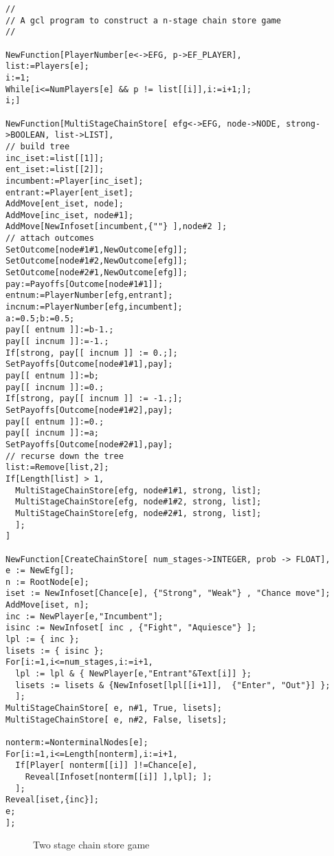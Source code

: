 \begin{verbatim}
//
// A gcl program to construct a n-stage chain store game
//

NewFunction[PlayerNumber[e<->EFG, p->EF_PLAYER],
list:=Players[e];
i:=1;
While[i<=NumPlayers[e] && p != list[[i]],i:=i+1;];
i;]

NewFunction[MultiStageChainStore[ efg<->EFG, node->NODE, strong->BOOLEAN, list->LIST],
// build tree
inc_iset:=list[[1]];
ent_iset:=list[[2]];
incumbent:=Player[inc_iset];
entrant:=Player[ent_iset];
AddMove[ent_iset, node];
AddMove[inc_iset, node#1];
AddMove[NewInfoset[incumbent,{""} ],node#2 ];
// attach outcomes 
SetOutcome[node#1#1,NewOutcome[efg]];
SetOutcome[node#1#2,NewOutcome[efg]];
SetOutcome[node#2#1,NewOutcome[efg]];
pay:=Payoffs[Outcome[node#1#1]];
entnum:=PlayerNumber[efg,entrant];
incnum:=PlayerNumber[efg,incumbent];
a:=0.5;b:=0.5;
pay[[ entnum ]]:=b-1.;
pay[[ incnum ]]:=-1.;
If[strong, pay[[ incnum ]] := 0.;];
SetPayoffs[Outcome[node#1#1],pay];
pay[[ entnum ]]:=b;
pay[[ incnum ]]:=0.;
If[strong, pay[[ incnum ]] := -1.;];
SetPayoffs[Outcome[node#1#2],pay];
pay[[ entnum ]]:=0.;
pay[[ incnum ]]:=a;
SetPayoffs[Outcome[node#2#1],pay];
// recurse down the tree
list:=Remove[list,2];
If[Length[list] > 1,
  MultiStageChainStore[efg, node#1#1, strong, list];
  MultiStageChainStore[efg, node#1#2, strong, list];
  MultiStageChainStore[efg, node#2#1, strong, list];
  ];
]

NewFunction[CreateChainStore[ num_stages->INTEGER, prob -> FLOAT],
e := NewEfg[];
n := RootNode[e];
iset := NewInfoset[Chance[e], {"Strong", "Weak"} , "Chance move"];
AddMove[iset, n];
inc := NewPlayer[e,"Incumbent"];
isinc := NewInfoset[ inc , {"Fight", "Aquiesce"} ];
lpl := { inc };
lisets := { isinc }; 
For[i:=1,i<=num_stages,i:=i+1,
  lpl := lpl & { NewPlayer[e,"Entrant"&Text[i]] };
  lisets := lisets & {NewInfoset[lpl[[i+1]],  {"Enter", "Out"}] };
  ];
MultiStageChainStore[ e, n#1, True, lisets];
MultiStageChainStore[ e, n#2, False, lisets];

nonterm:=NonterminalNodes[e];
For[i:=1,i<=Length[nonterm],i:=i+1,
  If[Player[ nonterm[[i]] ]!=Chance[e],
    Reveal[Infoset[nonterm[[i]] ],lpl]; ];
  ];	
Reveal[iset,{inc}];
e;
];

\end{verbatim}

\newpage
\begin{figure}[h]
\centerline{}
\caption{Two stage chain store game}
\end{figure}

